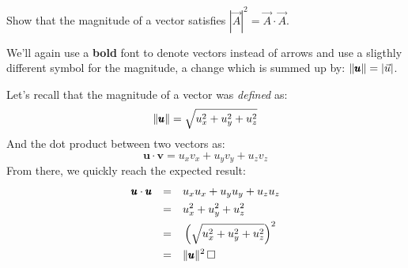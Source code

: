 \documentclass[solutions.tex]{subfiles}
\begin{document}
\maketitle
\begin{exercise} Show that the magnitude of a vector satisfies
$|\vec{A}|^2 = \vec{A}\cdot\vec{A}$.
\end{exercise}
\begin{remark} We'll again use a \textbf{bold} font to denote
vectors instead of arrows and use a sligthly different symbol
for the magnitude, a change which is summed up by:
$\lVert \pmb{u} \rVert = |\vec{u}|$.
\end{remark}
Let's recall that the magnitude of a vector was \textit{defined} as:
\[
	\lVert \pmb{u} \rVert = \sqrt{u_x^2 + u_y^2 + u_z^2}
\]
And the dot product between two vectors as:
\[
	\bm{u}\cdot\bm{v} = u_xv_x + u_yv_y + u_zv_z
\]
From there, we quickly reach the expected result:
\begin{equation*} \begin{aligned}
	\pmb{u}\cdot\pmb{u} &&=\quad& u_xu_x + u_yu_y + u_zu_z \\
	~ &&=\quad& u_x^2 + u_y^2 + u_z^2 \\
	~ &&=\quad& \left(\sqrt{u_x^2 + u_y^2 + u_z^2}\right)^2 \\
	~ &&=\quad& \lVert \pmb{u} \rVert^2 \,\Box
\end{aligned} \end{equation*}
\end{document}
